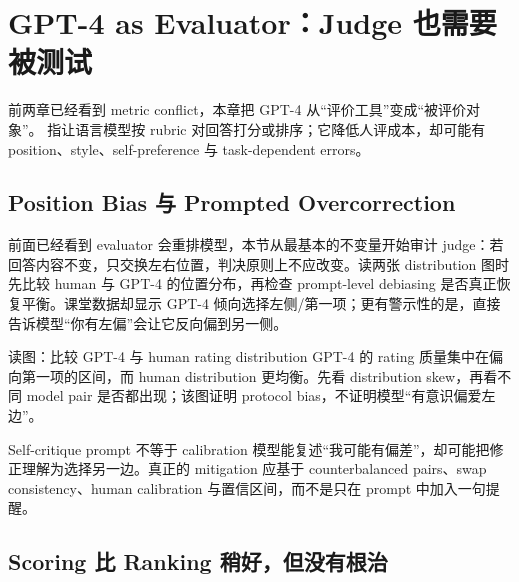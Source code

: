 \section{GPT-4 as Evaluator：Judge 也需要被测试}

前两章已经看到 metric conflict，本章把 GPT-4 从“评价工具”变成“被评价对象”。 指让语言模型按 rubric 对回答打分或排序；它降低人评成本，却可能有 position、style、self-preference 与 task-dependent errors。

\subsection{Position Bias 与 Prompted Overcorrection}

前面已经看到 evaluator 会重排模型，本节从最基本的不变量开始审计 judge：若回答内容不变，只交换左右位置，判决原则上不应改变。读两张 distribution 图时先比较 human 与 GPT-4 的位置分布，再检查 prompt-level debiasing 是否真正恢复平衡。课堂数据却显示 GPT-4 倾向选择左侧/第一项；更有警示性的是，直接告诉模型“你有左偏”会让它反向偏到另一侧。


\begin{knowledgebox}{读图：比较 GPT-4 与 human rating distribution}
GPT-4 的 rating 质量集中在偏向第一项的区间，而 human distribution 更均衡。先看 distribution skew，再看不同 model pair 是否都出现；该图证明 protocol bias，不证明模型“有意识偏爱左边”。
\end{knowledgebox}


\begin{warningbox}{Self-critique prompt 不等于 calibration}
模型能复述“我可能有偏差”，却可能把修正理解为选择另一边。真正的 mitigation 应基于 counterbalanced pairs、swap consistency、human calibration 与置信区间，而不是只在 prompt 中加入一句提醒。
\end{warningbox}


\subsection{Scoring 比 Ranking 稍好，但没有根治}

